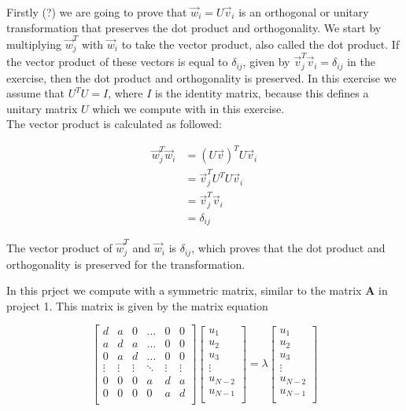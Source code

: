\documentclass{article}
\begin{document}
Firstly (?) we are going to prove that $\vec{w}_i = U \vec{v}_i$ is an orthogonal or unitary transformation that preserves the dot product and orthogonality. We start by multiplying $\vec{w}_j ^T$ with $\vec{w}_i$ to take the vector product, also called the dot product. If the vector product of these vectors is equal to $\delta_{ij}$, given by $\vec{v}_j ^T \vec{v}_i = \delta_{ij}$ in the exercise, then the dot product and orthogonality is preserved. In this exercise we assume that $U^T U = I$, where $I$ is the identity matrix, because this defines a unitary matrix $U$ which we compute with in this exercise. \\

The vector product is calculated as followed:

\begin{align*}
  \vec{w}_j ^T \vec{w}_i &= (U \vec{v})^T U \vec{v}_i \\
  &= \vec{v}_j ^T U^T U \vec{v}_i \\
  &= \vec{v}_j ^T \vec{v}_i \\
  &= \delta _{ij}
\end{align*}

The vector product of $\vec{w}_j ^T$ and $\vec{w}_i$ is $\delta_{ij}$, which proves that the dot product and orthogonality is preserved for the transformation.

In this prject we compute with a symmetric matrix, similar to the matrix \textbf{A} in project 1. This matrix is given by the matrix equation

  \begin{equation*} \label{eq:fullmatrixeq}
    \begin{bmatrix}
        d & a & 0 & \dots & 0 & 0 \\
        a & d & a & \dots & 0 & 0 \\
        0 & a & d & \dots & 0 & 0 \\
        \vdots & \vdots & \vdots & \ddots & \vdots & \vdots \\
        0 & 0 & 0 & a & d & a \\
        0 & 0 & 0 & 0 & a & d \\
    \end{bmatrix}
    \begin{bmatrix}
        u_1 \\
        u_2 \\
        u_3 \\
        \vdots \\
        u_{N-2} \\
        u_{N-1} \\
    \end{bmatrix}
      = \lambda
    \begin{bmatrix}
        u_1 \\
        u_2 \\
        u_3 \\
        \vdots \\
        u_{N-2} \\
        u_{N-1} \\
    \end{bmatrix}
  \end{equation*} \\
\end{document}
